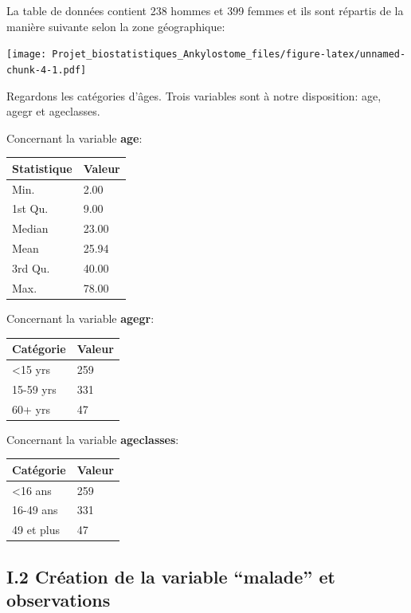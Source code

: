\documentclass[
]{article}
\begin{document}
La table de données contient 238 hommes et 399 femmes et ils sont
répartis de la manière suivante selon la zone géographique:

\texttt{[image: Projet\_biostatistiques\_Ankylostome\_files/figure-latex/unnamed-chunk-4-1.pdf]}

Regardons les catégories d'âges. Trois variables sont à notre
disposition: age, agegr et ageclasses.

Concernant la variable \textbf{age}:

\begin{longtable}[]{@{}ll@{}}
\toprule\noalign{}
Statistique & Valeur \\
\midrule\noalign{}
\endhead
\bottomrule\noalign{}
\endlastfoot
Min. & 2.00 \\
1st Qu. & 9.00 \\
Median & 23.00 \\
Mean & 25.94 \\
3rd Qu. & 40.00 \\
Max. & 78.00 \\
\end{longtable}

Concernant la variable \textbf{agegr}:

\begin{longtable}[]{@{}ll@{}}
\toprule\noalign{}
Catégorie & Valeur \\
\midrule\noalign{}
\endhead
\bottomrule\noalign{}
\endlastfoot
\textless15 yrs & 259 \\
15-59 yrs & 331 \\
60+ yrs & 47 \\
\end{longtable}

Concernant la variable \textbf{ageclasses}:

\begin{longtable}[]{@{}ll@{}}
\toprule\noalign{}
Catégorie & Valeur \\
\midrule\noalign{}
\endhead
\bottomrule\noalign{}
\endlastfoot
\textless16 ans & 259 \\
16-49 ans & 331 \\
49 et plus & 47 \\
\end{longtable}

\subsection{I.2 Création de la variable ``malade'' et
observations}\label{i.2-cruxe9ation-de-la-variable-malade-et-observations}
\end{document}
